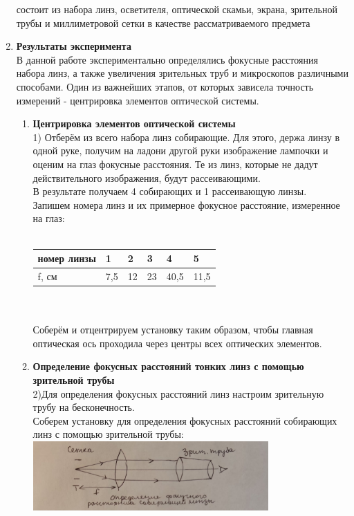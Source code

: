 \documentclass[a4paper]{article}
\begin{document}
\begin{multicols}{2}
\begin{enumerate}
состоит из набора линз, осветителя, оптической скамьи, экрана, зрительной трубы и миллиметровой сетки в качестве рассматриваемого предмета\\
\item \textbf{Результаты эксперимента}\\
В данной работе экспериментально определялись фокусные расстояния набора линз, а также увеличения зрительных труб и микроскопов различными способами. Один из важнейших этапов, от которых зависела точность измерений - центрировка элементов оптической системы.\\
\begin{enumerate}
\item \textbf{Центрировка элементов оптической системы}\\
1) Отберём из всего набора линз собирающие. Для этого, держа линзу в одной руке, получим на ладони другой руки изображение лампочки и оценим на глаз фокусные расстояния. Те из линз, которые не дадут действительного изображения, будут рассеивающими.\\
В результате получаем 4 собирающих и 1 рассеивающую линзы. \\
Запишем номера линз и их примерное фокусное расстояние, измеренное на глаз:\\
\\
\begin{tabular}{|l|l|l|l|l|l|}
\hline
номер линзы & 1 & 2 & 3 & 4 & 5\\
\hline
f, см & 7,5 & 12 & 23 & 40,5 & 11,5\\
\hline
\end{tabular}\\
\\
Соберём и отцентрируем установку таким образом, чтобы главная оптическая ось проходила через центры всех оптических элементов.
\item \textbf{Определение фокусных расстояний тонких линз с помощью зрительной трубы}\\
2)Для определения фокусных расстояний линз настроим зрительную трубу на бесконечность. \\
Соберем установку для определения фокусных расстояний собирающих линз с помощью зрительной трубы:\\
\includegraphics[width=9cm]{exp3}\\

\end{enumerate}
\end{enumerate}
\end{multicols}
\end{document}
